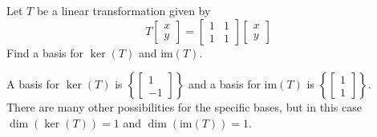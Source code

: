 \documentclass{ximera}
\begin{document}



\begin{problem}\label{prb:6.28}
 Let $T$ be a linear transformation given by
\[
T \left[ \begin{array}{r}
x\\
y
\end{array}\right] = \left[ \begin{array}{rrr}
1 &1  \\
1 & 1
\end{array}\right]
\left[ \begin{array}{r}
x\\
y
\end{array}\right]
\]
Find a basis for $\ker \left( T\right)$ and $\mbox{im} \left( T\right) $.

\begin{hint}
A basis for $\ker \left( T\right)$ is
$\left\{ \left[
\begin{array}{r}
1 \\
-1
\end{array}
\right] \right\}$
and a basis for $\mbox{im} \left( T\right)$ is
$\left\{ \left[
\begin{array}{r}
1 \\
1
\end{array}
\right] \right\}$. \\
There are many other possibilities for the specific bases, but in this case
$\dim \left( \ker \left( T\right) \right)=1 $ and $\dim \left( \mbox{im} \left( T\right) \right)=1$.
\end{hint}

\end{problem}
\end{document}
